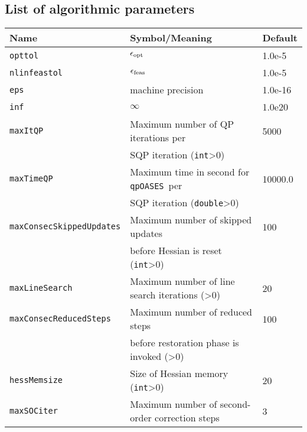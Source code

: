 \documentclass[	11pt,
				a4paper,
				abstract=true,
				twoside=true,
				bibliography=totoc, 
				headinclude=true,
				footinclude=false]{scrartcl}
\newcommand{\qpOASES}{\texttt{qpOASES}}
\begin{document}
\subsection{List of algorithmic parameters}
\begin{longtable}[c]{lll}
Name 							& Symbol/Meaning												& Default			\\\hline\hline
%
\texttt{opttol}					& $\epsilon_{\textup{opt}}$ 									& 1.0e-5	\\\hline
%
\texttt{nlinfeastol}			& $\epsilon_{\textup{feas}}$									& 1.0e-5	\\\hline
%
\texttt{eps}					& machine precision												& 1.0e-16	\\\hline
%
\texttt{inf}					& $\infty$														& 1.0e20	\\\hline
%
\texttt{maxItQP}				& Maximum number of QP iterations per							& 5000		\\
								& SQP iteration (\texttt{int}>0)								&			\\\hline
%
\texttt{maxTimeQP}				& Maximum time in second for \qpOASES\ per						& 10000.0		\\
								& SQP iteration (\texttt{double}>0)								&			\\\hline
%
\texttt{maxConsecSkippedUpdates}& Maximum number of skipped updates 							& 100		\\
								& before Hessian is reset (\texttt{int}>0)						&			\\\hline
%
\texttt{maxLineSearch}			& Maximum number of line search iterations (\text{int}>0)		& 20		\\\hline
%
\texttt{maxConsecReducedSteps}	& Maximum number of reduced steps 								& 100		\\
								& before restoration phase is invoked (\text{int}>0)			&			\\\hline
%
\texttt{hessMemsize}			& Size of Hessian memory (\texttt{int}>0)						& 20		\\\hline
%
\texttt{maxSOCiter}				& Maximum number of second-order correction steps				& 3			\\\hline
\end{longtable}
\end{document}
